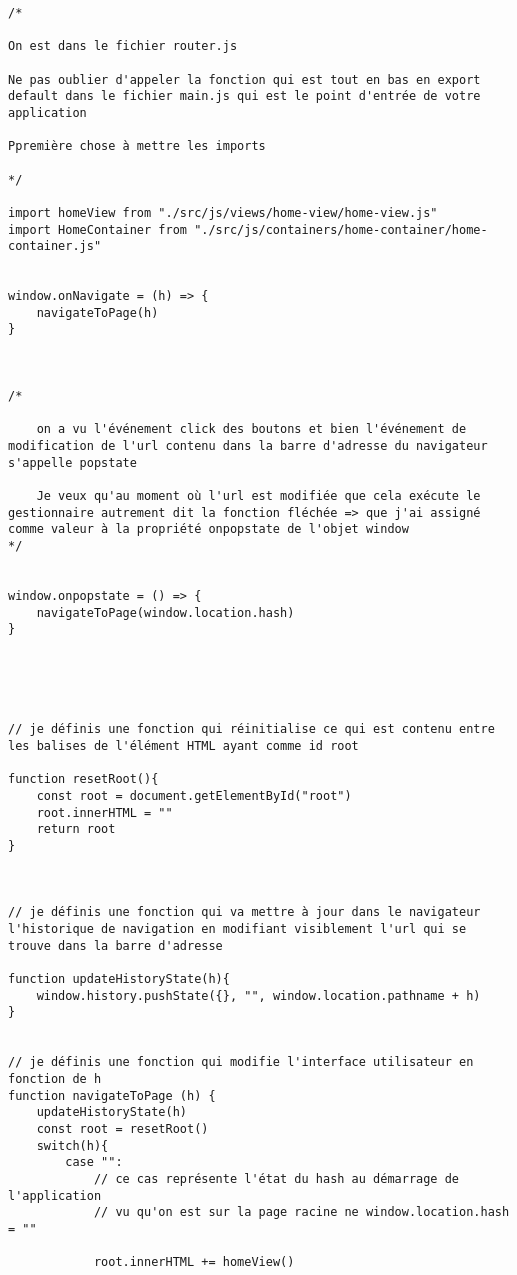 \documentclass[a4paper, 12pt]{report}
\begin{document}
\begin{lstlisting}[style=mainlststyle]
/*

On est dans le fichier router.js 

Ne pas oublier d'appeler la fonction qui est tout en bas en export default dans le fichier main.js qui est le point d'entrée de votre application

Ppremière chose à mettre les imports

*/

import homeView from "./src/js/views/home-view/home-view.js"
import HomeContainer from "./src/js/containers/home-container/home-container.js"


window.onNavigate = (h) => {
    navigateToPage(h)
}



/* 

    on a vu l'événement click des boutons et bien l'événement de modification de l'url contenu dans la barre d'adresse du navigateur s'appelle popstate 

    Je veux qu'au moment où l'url est modifiée que cela exécute le gestionnaire autrement dit la fonction fléchée => que j'ai assigné comme valeur à la propriété onpopstate de l'objet window
*/


window.onpopstate = () => {
    navigateToPage(window.location.hash)
}





// je définis une fonction qui réinitialise ce qui est contenu entre les balises de l'élément HTML ayant comme id root

function resetRoot(){
    const root = document.getElementById("root")
    root.innerHTML = ""
    return root
}



// je définis une fonction qui va mettre à jour dans le navigateur l'historique de navigation en modifiant visiblement l'url qui se trouve dans la barre d'adresse

function updateHistoryState(h){
    window.history.pushState({}, "", window.location.pathname + h)
}


// je définis une fonction qui modifie l'interface utilisateur en fonction de h
function navigateToPage (h) {
    updateHistoryState(h)
    const root = resetRoot()
    switch(h){
        case "":
            // ce cas représente l'état du hash au démarrage de l'application
            // vu qu'on est sur la page racine ne window.location.hash = ""

            root.innerHTML += homeView() 
            

\end{lstlisting}
\end{document}

